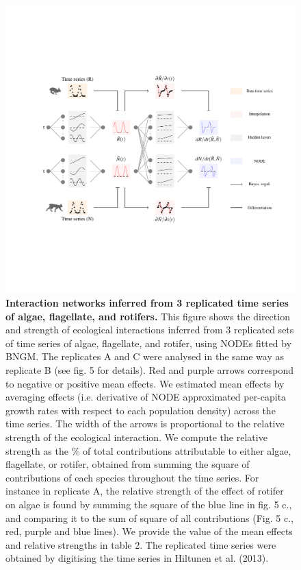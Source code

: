 \documentclass[11pt, oneside]{article}
\begin{document}
\newpage
\begin{figure}[H]
\includegraphics[width=1\linewidth,page=6]{figures/main.pdf}
\caption{
    \textbf{Interaction networks inferred from 3 replicated time series of algae, flagellate, and rotifers.}
    This figure shows the direction and strength of ecological interactions inferred from 3 replicated sets of time series of algae, flagellate, and rotifer, using NODEs fitted by BNGM.
    The replicates A and C were analysed in the same way as replicate B (see fig. 5 for details).
    Red and purple arrows correspond to negative or positive mean effects. 
    We estimated mean effects by averaging effects (i.e. derivative of NODE approximated per-capita growth rates with respect to each population density) across the time series.
    The width of the arrows is proportional to the relative strength of the ecological interaction. 
    We compute the relative strength as the \% of total contributions attributable to either algae, flagellate, or rotifer, obtained from summing the square of contributions of each species throughout the time series.
    For instance in replicate A, the relative strength of the effect of rotifer on algae is found by summing the square of the blue line in fig. 5 c., and comparing it to the sum of square of all contributions (Fig. 5 c., red, purple and blue lines).
    We provide the value of the mean effects and relative strengths in table 2.
    The replicated time series were obtained by digitising the time series in Hiltunen et al. (2013).
}
\end{figure}
\newpage
\end{document}
